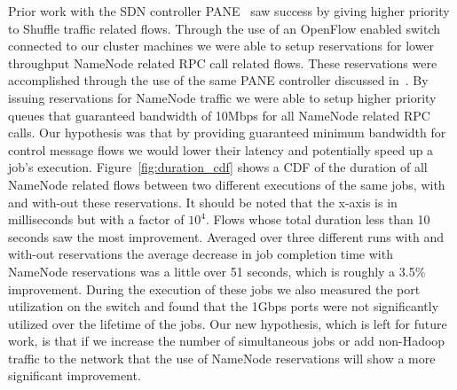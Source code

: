 Prior work with the SDN controller PANE~\cite{PANE} saw success by giving higher 
priority to Shuffle traffic related flows. Through the use of an OpenFlow enabled switch 
connected to our cluster machines we were able to setup reservations for lower throughput 
NameNode related RPC call related flows. These reservations were accomplished through 
the use of the same PANE controller discussed in~\cite{PANE}. By issuing reservations 
for NameNode traffic we were able to setup higher priority queues that guaranteed 
bandwidth of 10Mbps 
for all NameNode related RPC calls. Our hypothesis was that by providing 
guaranteed minimum bandwidth for control message flows we would lower their
latency and potentially speed up a job's execution. Figure~\ref{fig:duration_cdf}
shows a CDF of the duration of all NameNode related flows between two different
executions of the same jobs, with and with-out these reservations. It should be
noted that the x-axis is in milliseconds but with a factor of $10^4$. Flows whose
total duration less than 10 seconds saw the most improvement. Averaged over three
different runs with and with-out reservations the average decrease in job 
completion time with NameNode reservations was a little over 51 seconds, which is
roughly a 3.5\% improvement. During the execution of these jobs we also measured
the port utilization on the switch and found that the 1Gbps ports were not 
significantly utilized over the lifetime of the jobs. Our new hypothesis, which is
left for future work, is that if we increase the number of simultaneous jobs or 
add non-Hadoop traffic to the network that the use of NameNode reservations will 
show a more significant improvement. 

